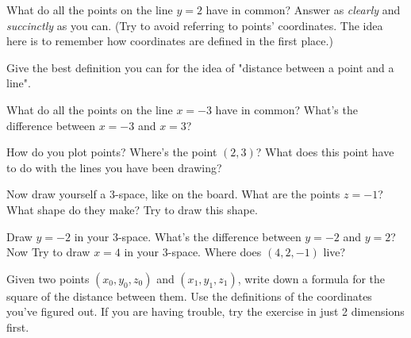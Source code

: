 \documentclass[12pt]{exam}
\theoremstyle{definition}
\begin{document}
\begin{questions}

\question
What do all the points on the line $y = 2$ have in common? Answer as \emph{clearly} and \emph{succinctly} as you can. (Try to avoid referring to points' coordinates. The idea here is to remember how coordinates are defined in the first place.)

\question
Give the best definition you can for the idea of "distance between a point and a line".

\question
What do all the points on the line $x = -3$ have in common? What's the difference between $x = -3$ and $x = 3$?

\question 
How do you plot points? Where's the point $(2, 3)$? What does this point have to do with the lines you have been drawing?

\question
Now draw yourself a 3-space, like on the board. What are the points $z = -1$? What shape do they make? Try to draw this shape.

\question 
Draw $y = -2$ in your 3-space. What's the difference between $y = -2$ and $y = 2$? Now Try to draw $x = 4$ in your 3-space. Where does $(4, 2, -1)$ live?

\question 
Given two points $(x_0, y_0, z_0)$ and $(x_1, y_1, z_1)$, write down a formula for the square of the distance between them. Use the definitions of the coordinates you've figured out. If you are having trouble, try the exercise in just 2 dimensions first.

\end{questions} 
\end{document}
